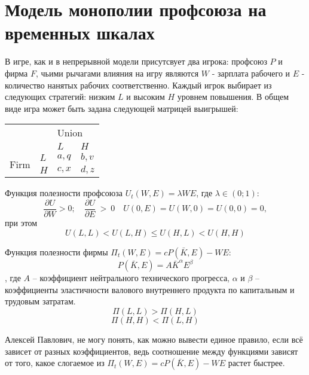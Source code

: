 \section{Модель монополии профсоюза на временных шкалах}

В игре, как и в непрерывной модели присутсвует два игрока: профсоюз $P$ и фирма $F$, чьими рычагами влияния на игру являются $W$ - зарплата рабочего и $E$ - количество нанятых рабочих соответственно.
Каждый игрок выбирает из следующих стратегий: низким $L$ и высоким $H$ уровнем повышения. В общем виде игра может быть задана следующей матрицей выигрышей: 

\begin{table}[h]
	\centering
	\begin{tabular}{|l|l|l|l|}
		\hline
		\multicolumn{2}{|l|}{\multirow{2}{*}{}} & \multicolumn{2}{l|}{Union} \\ \cline{3-4} 
		\multicolumn{2}{|l|}{}                  & $L$            & $H$            \\ \hline
		\multirow{2}{*}{Firm}     & $L$     & $a,q$          & $b,v$          \\ \cline{2-4} 
		& $H$     & $c,x$          & $d,z$          \\ \hline
	\end{tabular}
\end{table}  

Функция полезности профсоюза  $U_t(W,E)=\lambda WE$, где $\lambda \in(0;1)$:
$$\frac{\partial U}{\partial W} > 0; \quad \frac{\partial U}{\partial E}~>~0 \quad U(0,E)=U(W,0)=U(0,0)=0,$$
при этом 
$$U(L,L) < U(L,H) \le U(H, L) < U(H,H) $$

Функция полезности фирмы $\Pi_t(W,E)=cP(\bar{K},E)-WE$:
$$P(\bar{K}, E)=A\bar{K}^\alpha E^\beta$$, где $A$ – коэффициент нейтрального технического прогресса, $\alpha$ и $\beta$ – коэффициенты эластичности валового внутреннего продукта по капитальным и трудовым затратам.\\

$$\Pi(L,L)>\Pi(H,L)$$
$$\Pi(H,H)<\Pi(L,H)$$

Алексей Павлович, не могу понять, как можно вывести единое правило, если всё зависет от разных коэффициентов, ведь соотношение между функциями зависят от того, какое слогаемое из $\Pi_t(W,E)=cP(\bar{K},E)-WE$ растет быстрее.